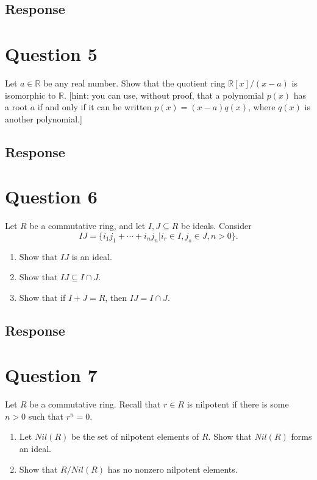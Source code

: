 \documentclass [12pt] {article}
\newcommand{\R}{\mathbb{R}}
\begin{document}
\subsection*{Response}
\newpage

\section*{Question 5}
Let $a\in\R$ be any real number. Show that the quotient ring $\R[x]/(x-a)$ is isomorphic to $\R$. [hint: you can use, without proof, that a polynomial $p(x)$ has a root $a$ if and only if it can be written $p(x)=(x-a)q(x)$, where $q(x)$ is another polynomial.] 
\subsection*{Response}
\newpage

\section*{Question 6}
Let $R$ be a commutative ring, and let $I,J\subseteq R$ be ideals. Consider $$IJ=\{i_1j_1+\cdots + i_nj_n|i_r\in I, j_s\in J, n>0\}.$$

\begin{enumerate}
    \item Show that $IJ$ is an ideal. 

    \item Show that $IJ\subseteq I\cap J$. 
    \item Show that if $I+J=R$, then $IJ=I\cap J$.
\end{enumerate}
\subsection*{Response}
\newpage

\section*{Question 7}
Let $R$ be a commutative ring. Recall that $r\in R$ is nilpotent if there is some $n>0$ such that $r^n=0$. 

\begin{enumerate}
    \item Let $Nil(R)$ be the set of nilpotent elements of $R$. Show that $Nil(R)$ forms an ideal. 

    \item Show that $R/Nil(R)$ has no nonzero nilpotent elements.
\end{enumerate}
\end{document}
